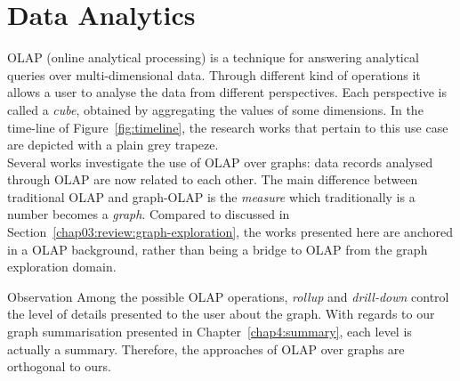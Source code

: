 
\section{Data Analytics}
\label{chap03:review:data-analytics}

OLAP (online analytical processing) is a technique for answering analytical queries over multi-dimensional data. Through different kind of operations it allows a user to analyse the data from different perspectives. Each perspective is called a \emph{cube}, obtained by aggregating the values of some dimensions. In the time-line of Figure~\ref{fig:timeline}, the research works that pertain to this use case are depicted with a plain grey trapeze.\\

Several works investigate the use of OLAP over graphs: data records analysed through OLAP are now related to each other. The main difference between traditional OLAP and graph-OLAP is the \emph{measure} which traditionally is a number becomes a \emph{graph}. Compared to \cite{tian:sigmod:2008} discussed in Section~\ref{chap03:review:graph-exploration}, the works presented here are anchored in a OLAP background, rather than being a bridge to OLAP from the graph exploration domain.

\begin{centeremph}{Observation}
	Among the possible OLAP operations, \emph{rollup} and \emph{drill-down} control the level of details presented to the user about the graph. With regards to our graph summarisation presented in Chapter~\ref{chap4:summary}, each level is actually a summary. Therefore, the approaches of OLAP over graphs are orthogonal to ours.
\end{centeremph}

